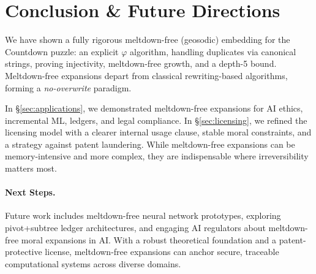 \documentclass[acmsmall]{acmart}
\theoremstyle{definition}
\theoremstyle{remark}
\begin{document}
\section{Conclusion \& Future Directions}
We have shown a fully rigorous meltdown-free (geosodic) embedding for the Countdown
puzzle: an explicit \(\varphi\) algorithm, handling duplicates via canonical strings,
proving injectivity, meltdown-free growth, and a depth-5 bound. Meltdown-free expansions
depart from classical rewriting-based algorithms, forming a \emph{no-overwrite} paradigm.

In \S\ref{sec:applications}, we demonstrated meltdown-free expansions for AI ethics,
incremental ML, ledgers, and legal compliance. In \S\ref{sec:licensing}, we refined
the licensing model with a clearer internal usage clause, stable moral constraints,
and a strategy against patent laundering. While meltdown-free expansions can be
memory-intensive and more complex, they are indispensable where irreversibility
matters most.

\paragraph{Next Steps.}
Future work includes meltdown-free neural network prototypes, exploring pivot+subtree
ledger architectures, and engaging AI regulators about meltdown-free moral expansions
in AI. With a robust theoretical foundation and a patent-protective license,
meltdown-free expansions can anchor secure, traceable computational systems
across diverse domains.





\end{document}
